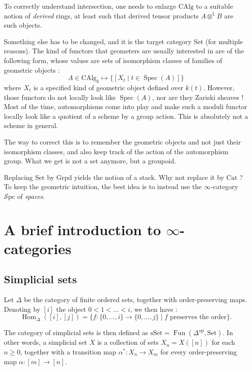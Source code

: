 \documentclass[11pt]{article}
\theoremstyle{definition}
\newcommand{\CAlg}{\mathrm{CAlg}}
\newcommand{\Cat}{\mathrm{Cat}}
\newcommand{\Fun}{\operatorname{Fun}}
\newcommand{\Grpd}{\mathrm{Grpd}}
\newcommand{\Hom}{\operatorname{Hom}}
\renewcommand{\L}{\mathbb{L}}
\newcommand{\op}{\mathrm{op}}
\newcommand{\Set}{\mathrm{Set}}
\newcommand{\Spc}{\mathcal{S}\mathrm{pc}}
\newcommand{\Spec}{\operatorname{Spec}}
\newcommand{\sSet}{\mathrm{sSet}}
\begin{document}
To correctly understand intersection, one needs to enlarge $\CAlg$ to a suitable notion of \emph{derived} rings, at least such that derived tensor products $A \otimes^{\L} B$ are such objects.

Something else has to be changed, and it is the target category $\Set$ (for multiple reasons).
The kind of functors that geometers are usually interested in are of the following form, whose values are sets of isomorphism classes of families of geometric objects :
\[
    A \in \CAlg_k \mapsto \{[X_t \mid t \in \Spec(A)]\}
\]
where $X_t$ is a specified kind of geometric object defined over $k(t)$.
However, those functors do not locally look like $\Spec(A)$, nor are they Zariski sheaves !
Most of the time, automorphisms come into play and make such a moduli functor locally look like a quotient of a scheme by a group action.
This is absolutely not a scheme in general.

The way to correct this is to remember the geometric objects and not just their isomorphism classes, and also keep track of the action of the automorphism group.
What we get is not a set anymore, but a groupoid.

Replacing $\Set$ by $\Grpd$ yields the notion of a stack.
Why not replace it by $\Cat$ ? To keep the geometric intuition, the best idea is to instead use the $\infty$-category $\Spc$ of \emph{spaces}.

\section{A brief introduction to $\infty$-categories}

\subsection{Simplicial sets}

Let $\Delta$ be the category of finite ordered sets, together with order-preserving maps.
Denoting by $[i]$ the object ${0 < 1 < \dots < i}$, we then have :
\[
    \Hom_{\Delta}([i], [j]) = \{f : \{0, \dots, i\} \to \{0, \dots, j\} \mid f \text{ preserves the order}\}.
\]

The category of simplicial sets is then defined as $\sSet = \Fun(\Delta^{\op}, \Set)$. In other words, a simplicial set $X$ is a collection of sets $X_n = X([n])$ for each $n \geq 0$, together with a transition map $\alpha^* : X_n \to X_m$ for every order-preserving map $\alpha : [m] \to [n]$.
\end{document}
